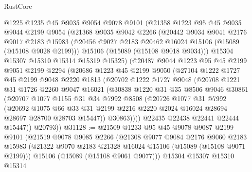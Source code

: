 \begin{lexlean}{RustCore}
\begin{coremodule}
    @1225
    @1235
    @45
    @9035
    @9054
    @9078
    @9101
    (@21358
      @1223
      @95
      @45
      @9035
      @9044
      @2199
      @9054
      (@21368
        @9035
        @9042
        @2266
        (@20442
          @9034
          @9041
          @2176
          @9017
          @2183
          @15983
          (@20456 @9027 @2183 @20462 @16024 @15106 (@15089 (@15108 @9028 @2199)))
          @15106
          (@15089 (@15108 @9018 @9034)))
        @15304
        @15307
        @15310
        @15314
        @15319
        @15325)
      (@20487
        @9044
        @1223
        @95
        @45
        @2199
        @9051
        @2199
        @2294
        (@20686
          @1223
          @45
          @2199
          @9050
          (@27104
            @1222
            @1727
            @45
            @2199
            @9048
            @2220
            @1813
            (@20702
              @1222
              @1727
              @9048
              (@20708
                @1221
                @31
                @1726
                @2260
                @9047
                @16021
                (@30838
                  @1220
                  @31
                  @35
                  @8506
                  @9046
                  @30861
                  (@20707
                    @1077
                    @1155
                    @31
                    @34
                    @7992
                    @8508
                    (@20726
                      @1077
                      @31
                      @7992
                      (@20692
                        @1075
                        @66
                        @33
                        @31
                        @2199
                        @2216
                        @2220
                        @2024
                        @16024
                        @28694
                        @28697
                        @28700
                        @28703
                        @15447))
                    @30863))))
            @22435
            @22438
            @22441
            @22444
            @15447))
        @20793))
@31128 := @21509
    @1233
    @95
    @45
    @9078
    @9087
    @2199
    @9101
    (@21519
      @9078
      @9085
      @2266
      (@21308
        @9077
        @9084
        @2176
        @9060
        @2183
        @15983
        (@21322 @9070 @2183 @21328 @16024 @15106 (@15089 (@15108 @9071 @2199)))
        @15106
        (@15089 (@15108 @9061 @9077)))
      @15304
      @15307
      @15310
      @15314

\end{coremodule}
\end{lexlean}
